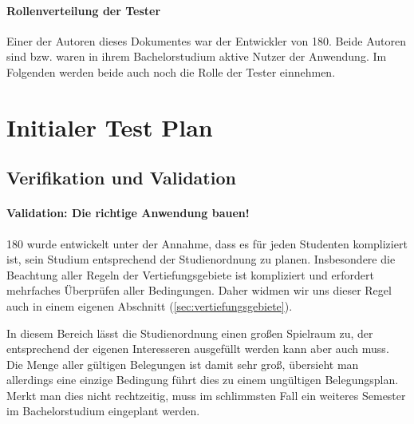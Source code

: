 \documentclass[ngerman]{article}
\begin{document}
\paragraph{Rollenverteilung der Tester}

Einer der Autoren dieses Dokumentes war der Entwickler von 180.
Beide Autoren sind bzw. waren in ihrem Bachelorstudium aktive Nutzer der Anwendung.
Im Folgenden werden beide auch noch die Rolle der Tester einnehmen.

\section{Initialer Test Plan}

\subsection{Verifikation und Validation}

\paragraph{Validation: Die richtige Anwendung bauen!}
\label{sec:verification_and_validation}

180 wurde entwickelt unter der Annahme, dass es für jeden Studenten kompliziert ist, sein Studium ent\-sprech\-end der Studienordnung zu planen.
Insbesondere die Beachtung aller Regeln der Vertiefungsgebiete ist kompliziert und erfordert mehrfaches Über\-prü\-fen aller Bedingungen.
Daher widmen wir uns dieser Regel auch in einem eigenen Abschnitt (\ref{sec:vertiefungsgebiete}).


In diesem Bereich lässt die Studienordnung einen großen Spielraum zu, der entsprechend der eigenen Interesseren ausgefüllt werden kann aber auch muss.
Die Menge aller gültigen Belegungen ist damit sehr groß, übersieht man allerdings eine einzige Bedingung führt dies zu einem ungültigen Belegungsplan.
Merkt man dies nicht rechtzeitig, muss im schlimmsten Fall ein weiteres Semester im Bachelorstudium eingeplant werden.
\end{document}
